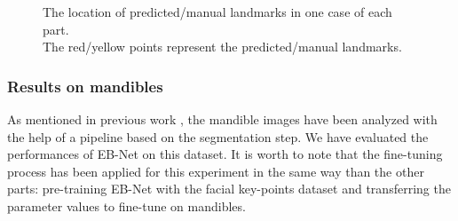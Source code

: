 \documentclass[review]{elsarticle}
\begin{document}
\begin{figure}[h!]
    \centering
    \caption{The location of predicted/manual landmarks in one case of each part.\\The red/yellow points represent the predicted/manual landmarks.}
    \label{figpdl}
\end{figure}

\subsubsection{Results on mandibles}
As mentioned in previous work \cite{le2017maelab}, the mandible images have been analyzed with the help of a pipeline based on the segmentation step. We have evaluated the performances of EB-Net on this dataset. It is worth to note that the fine-tuning process has been applied for this experiment in the same way than the other parts: pre-training EB-Net with the facial key-points dataset and transferring the parameter values to fine-tune on mandibles.
\end{document}
